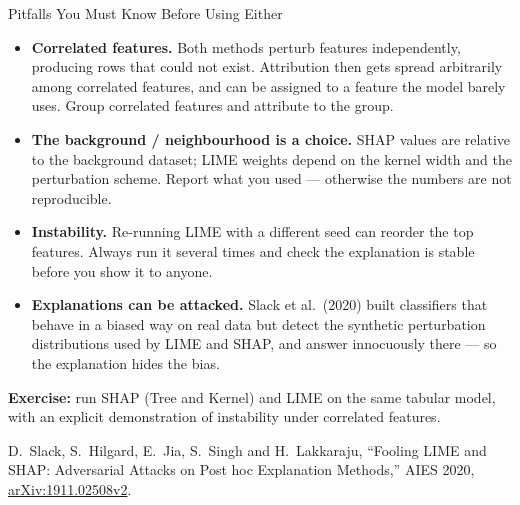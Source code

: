 \begin{frame}[allowframebreaks]{Pitfalls You Must Know Before Using Either}

    \begin{itemize}
        \setlength\itemsep{0.5em}
        \item \textbf{Correlated features.} Both methods perturb features independently, producing
              rows that could not exist. Attribution then gets spread arbitrarily among correlated
              features, and can be assigned to a feature the model barely uses. Group correlated
              features and attribute to the group.

        \item \textbf{The background / neighbourhood is a choice.} SHAP values are relative to the
              background dataset; LIME weights depend on the kernel width and the perturbation
              scheme. Report what you used --- otherwise the numbers are not reproducible.

        \item \textbf{Instability.} Re-running LIME with a different seed can reorder the top
              features. Always run it several times and check the explanation is stable before
              you show it to anyone.

        \item \textbf{Explanations can be attacked.} Slack et al.\ (2020) built classifiers that
              behave in a biased way on real data but detect the synthetic perturbation
              distributions used by LIME and SHAP, and answer innocuously there --- so the
              explanation hides the bias.
    \end{itemize}

    \vspace{0.5em}
    \begin{block}{}
        \centering
        \small \textbf{Exercise:} run SHAP (Tree and Kernel) and LIME on the same tabular model,
        with an explicit demonstration of instability under correlated features.
    \end{block}

    \vspace{0.3em}
    {\scriptsize D.~Slack, S.~Hilgard, E.~Jia, S.~Singh and H.~Lakkaraju, ``Fooling LIME and SHAP:
    Adversarial Attacks on Post hoc Explanation Methods,'' AIES 2020,
    \href{https://arxiv.org/abs/1911.02508v2}{arXiv:1911.02508v2}.}
\end{frame}

